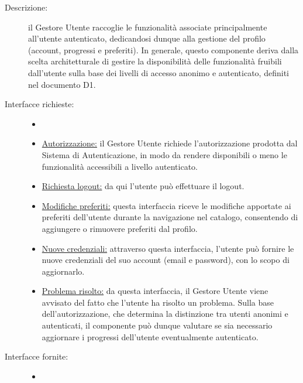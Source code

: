 \documentclass[11pt, a4paper]{article}
\theoremstyle{definition} %
\begin{document}
\begin{description}
    \item[Descrizione:] il Gestore Utente raccoglie le funzionalità
    associate principalmente all'utente autenticato, dedicandosi dunque alla
    gestione del profilo (account, progressi e preferiti). In generale, questo
    componente deriva dalla scelta architetturale di gestire la disponibilità
    delle funzionalità fruibili dall'utente sulla base dei livelli di accesso
    anonimo e autenticato, definiti nel documento D1.

    \item[Interfacce richieste:]
    \begin{itemize}
        \item[]

        \item \underline{Autorizzazione:} il Gestore Utente richiede l'autorizzazione
        prodotta dal Sistema di Autenticazione, in modo da rendere disponibili o
        meno le funzionalità accessibili a livello autenticato.

        \item \underline{Richiesta logout:} da qui l'utente può effettuare il logout.

        \item \underline{Modifiche preferiti:} questa interfaccia riceve le
        modifiche apportate ai preferiti dell'utente durante la navigazione
        nel catalogo, consentendo di aggiungere o rimuovere preferiti dal
        profilo.

        \item \underline{Nuove credenziali:} attraverso questa interfaccia,
        l'utente può fornire le nuove credenziali del suo account (email e
        password), con lo scopo di aggiornarlo.

        \item \underline{Problema risolto:} da questa interfaccia, il Gestore
        Utente viene avvisato del fatto che l'utente ha risolto un problema.
        Sulla base dell'autorizzazione, che determina la distinzione tra
        utenti anonimi e autenticati, il componente può dunque valutare se
        sia necessario aggiornare i progressi dell'utente eventualmente autenticato.
    \end{itemize}

    \item[Interfacce fornite:]
    \begin{itemize}
        \item[]


\end{itemize}
\end{description}
\end{document}

